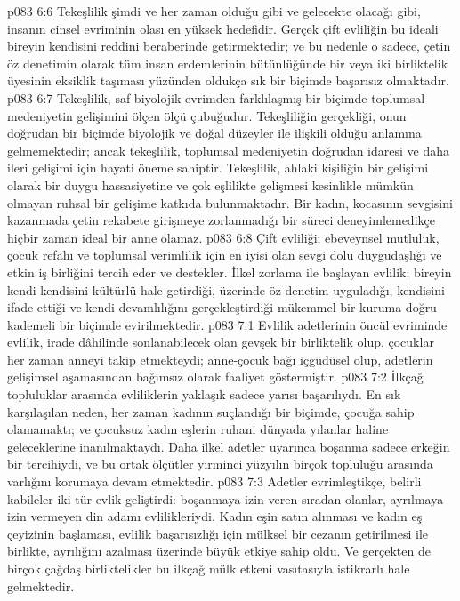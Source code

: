 \vs p083 6:6 Tekeşlilik şimdi ve her zaman olduğu gibi ve gelecekte olacağı gibi, insanın cinsel evriminin olası en yüksek hedefidir. Gerçek çift evliliğin bu ideali bireyin kendisini reddini beraberinde getirmektedir; ve bu nedenle o sadece, çetin öz denetimin olarak tüm insan erdemlerinin bütünlüğünde bir veya iki birliktelik üyesinin eksiklik taşıması yüzünden oldukça sık bir biçimde başarısız olmaktadır.
\vs p083 6:7 Tekeşlilik, saf biyolojik evrimden farklılaşmış bir biçimde toplumsal medeniyetin gelişimini ölçen ölçü çubuğudur. Tekeşliliğin gerçekliği, onun doğrudan bir biçimde biyolojik ve doğal düzeyler ile ilişkili olduğu anlamına gelmemektedir; ancak tekeşlilik, toplumsal medeniyetin doğrudan idaresi ve daha ileri gelişimi için hayati öneme sahiptir. Tekeşlilik, ahlaki kişiliğin bir gelişimi olarak bir duygu hassasiyetine ve çok eşlilikte gelişmesi kesinlikle mümkün olmayan ruhsal bir gelişime katkıda bulunmaktadır. Bir kadın, kocasının sevgisini kazanmada çetin rekabete girişmeye zorlanmadığı bir süreci deneyimlemedikçe hiçbir zaman ideal bir anne olamaz.
\vs p083 6:8 Çift evliliği; ebeveynsel mutluluk, çocuk refahı ve toplumsal verimlilik için en iyisi olan sevgi dolu duygudaşlığı ve etkin iş birliğini tercih eder ve destekler. İlkel zorlama ile başlayan evlilik; bireyin kendi kendisini kültürlü hale getirdiği, üzerinde öz denetim uyguladığı, kendisini ifade ettiği ve kendi devamlılığını gerçekleştirdiği mükemmel bir kuruma doğru kademeli bir biçimde evirilmektedir.
\vs p083 7:1 Evlilik adetlerinin öncül evriminde evlilik, irade dâhilinde sonlanabilecek olan gevşek bir birliktelik olup, çocuklar her zaman anneyi takip etmekteydi; anne\hyp{}çocuk bağı içgüdüsel olup, adetlerin gelişimsel aşamasından bağımsız olarak faaliyet göstermiştir.
\vs p083 7:2 İlkçağ topluluklar arasında evliliklerin yaklaşık sadece yarısı başarılıydı. En sık karşılaşılan neden, her zaman kadının suçlandığı bir biçimde, çocuğa sahip olamamaktı; ve çocuksuz kadın eşlerin ruhani dünyada yılanlar haline geleceklerine inanılmaktaydı. Daha ilkel adetler uyarınca boşanma sadece erkeğin bir tercihiydi, ve bu ortak ölçütler yirminci yüzyılın birçok topluluğu arasında varlığını korumaya devam etmektedir.
\vs p083 7:3 Adetler evrimleştikçe, belirli kabileler iki tür evlik geliştirdi: boşanmaya izin veren sıradan olanlar, ayrılmaya izin vermeyen din adamı evlilikleriydi. Kadın eşin satın alınması ve kadın eş çeyizinin başlaması, evlilik başarısızlığı için mülksel bir cezanın getirilmesi ile birlikte, ayrılığını azalması üzerinde büyük etkiye sahip oldu. Ve gerçekten de birçok çağdaş birliktelikler bu ilkçağ mülk etkeni vasıtasıyla istikrarlı hale gelmektedir.
